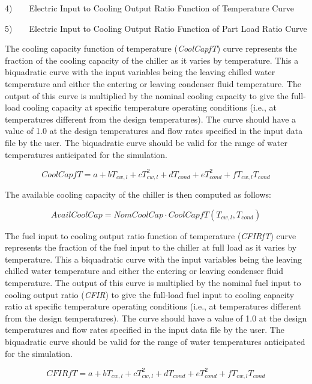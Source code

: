 4)~~~~Electric Input to Cooling Output Ratio Function of Temperature Curve

5)~~~~Electric Input to Cooling Output Ratio Function of Part Load Ratio Curve

The cooling capacity function of temperature (\emph{CoolCapfT}) curve represents the fraction of the cooling capacity of the chiller as it varies by temperature. This a biquadratic curve with the input variables being the leaving chilled water temperature and either the entering or leaving condenser fluid temperature. The output of this curve is multiplied by the nominal cooling capacity to give the full-load cooling capacity at specific temperature operating conditions (i.e., at temperatures different from the design temperatures). The curve should have a value of 1.0 at the design temperatures and flow rates specified in the input data file by the user. The biquadratic curve should be valid for the range of water temperatures anticipated for the simulation.

\begin{equation}
CoolCapfT = a + b{T_{cw,l}} + cT_{cw,l}^2 + d{T_{cond}} + eT_{cond}^2 + f{T_{cw,l}}{T_{cond}}
\end{equation}

The available cooling capacity of the chiller is then computed as follows:

\begin{equation}
AvailCoolCap = NomCoolCap \cdot CoolCapfT({T_{cw,l}},{T_{cond}})
\end{equation}

The fuel input to cooling output ratio function of temperature (\emph{CFIRfT}) curve represents the fraction of the fuel input to the chiller at full load as it varies by temperature. This a biquadratic curve with the input variables being the leaving chilled water temperature and either the entering or leaving condenser fluid temperature. The output of this curve is multiplied by the nominal fuel input to cooling output ratio (\emph{CFIR}) to give the full-load fuel input to cooling capacity ratio at specific temperature operating conditions (i.e., at temperatures different from the design temperatures). The curve should have a value of 1.0 at the design temperatures and flow rates specified in the input data file by the user. The biquadratic curve should be valid for the range of water temperatures anticipated for the simulation.

\begin{equation}
CFIRfT = a + b{T_{cw,l}} + cT_{cw,l}^2 + d{T_{cond}} + eT_{cond}^2 + f{T_{cw,l}}{T_{cond}}
\end{equation}

